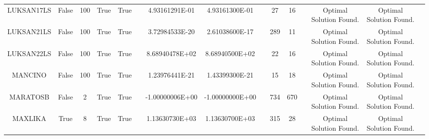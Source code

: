 \begin{longtable}{ccccccccccccccc}
	\cellcolor{default2} LUKSAN17LS& \cellcolor{default2} False& \cellcolor{default2} 100& \cellcolor{default2} True& \cellcolor{default2} True& \cellcolor{header} & \cellcolor{best} 4.93161291E-01& \cellcolor{ok} 4.93161300E-01& \cellcolor{header} & \cellcolor{ok} 27& \cellcolor{best} 16& \cellcolor{header} & \cellcolor{default2} Optimal Solution Found.& \cellcolor{default2} Optimal Solution Found.& \cellcolor{header} \\
	\cellcolor{default1} LUKSAN21LS& \cellcolor{default1} False& \cellcolor{default1} 100& \cellcolor{default1} True& \cellcolor{default1} True& \cellcolor{header} & \cellcolor{best} 3.72984533E-20& \cellcolor{ok} 2.61038600E-17& \cellcolor{header} & \cellcolor{poor} 289& \cellcolor{best} 11& \cellcolor{header} & \cellcolor{default1} Optimal Solution Found.& \cellcolor{default1} Optimal Solution Found.& \cellcolor{header} \\
	\cellcolor{default2} LUKSAN22LS& \cellcolor{default2} False& \cellcolor{default2} 100& \cellcolor{default2} True& \cellcolor{default2} True& \cellcolor{header} & \cellcolor{best} 8.68940478E+02& \cellcolor{ok} 8.68940500E+02& \cellcolor{header} & \cellcolor{ok} 22& \cellcolor{best} 16& \cellcolor{header} & \cellcolor{default2} Optimal Solution Found.& \cellcolor{default2} Optimal Solution Found.& \cellcolor{header} \\
	\cellcolor{default1} MANCINO& \cellcolor{default1} False& \cellcolor{default1} 100& \cellcolor{default1} True& \cellcolor{default1} True& \cellcolor{header} & \cellcolor{best} 1.23976441E-21& \cellcolor{ok} 1.43399300E-21& \cellcolor{header} & \cellcolor{best} 15& \cellcolor{ok} 18& \cellcolor{header} & \cellcolor{default1} Optimal Solution Found.& \cellcolor{default1} Optimal Solution Found.& \cellcolor{header} \\
	\cellcolor{default2} MARATOSB& \cellcolor{default2} False& \cellcolor{default2} 2& \cellcolor{default2} True& \cellcolor{default2} True& \cellcolor{header} & \cellcolor{best} -1.00000006E+00& \cellcolor{ok} -1.00000000E+00& \cellcolor{header} & \cellcolor{ok} 734& \cellcolor{best} 670& \cellcolor{header} & \cellcolor{default2} Optimal Solution Found.& \cellcolor{default2} Optimal Solution Found.& \cellcolor{header} \\
	\cellcolor{default1} MAXLIKA& \cellcolor{default1} True& \cellcolor{default1} 8& \cellcolor{default1} True& \cellcolor{default1} True& \cellcolor{header} & \cellcolor{ok} 1.13630730E+03& \cellcolor{best} 1.13630700E+03& \cellcolor{header} & \cellcolor{poor} 315& \cellcolor{best} 28& \cellcolor{header} & \cellcolor{default1} Optimal Solution Found.& \cellcolor{default1} Optimal Solution Found.& \cellcolor{header} \\

\end{longtable}
